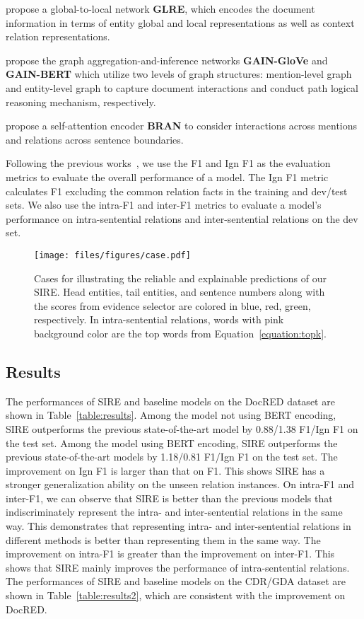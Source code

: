 \documentclass[11pt,a4paper]{article}
\begin{document}
\citet{GLRE} propose a global-to-local network \textbf{GLRE}, which encodes the document information in terms of entity global and local representations as well as context relation representations. 

\citet{GAIN} propose the graph aggregation-and-inference networks \textbf{GAIN-GloVe} and \textbf{GAIN-BERT} which utilize two levels of graph structures: mention-level graph and entity-level graph to capture document interactions and conduct path logical reasoning mechanism, respectively. 

\citet{BRAN} propose a self-attention encoder \textbf{BRAN} to consider interactions across mentions and relations across sentence boundaries.



Following the previous works~\citep{DocRED-paper,GAIN}, we use the F1 and Ign F1 as the evaluation metrics to evaluate the overall performance of a model. The Ign F1 metric calculates F1 excluding the common relation facts in the training and dev/test sets. We also use the intra-F1 and inter-F1 metrics to evaluate a model's performance on intra-sentential relations and inter-sentential relations on the dev set.

\begin{figure*}
    \centering
    \texttt{[image: files/figures/case.pdf]}
    \caption{Cases for illustrating the reliable and explainable predictions of our SIRE. Head entities, tail entities, and sentence numbers along with the scores from evidence selector are colored in blue, red, green, respectively. In intra-sentential relations, words with pink background color are the top  words from Equation~\ref{equation:topk}. }
    \label{fig:case}
\end{figure*}

\subsection{Results\label{ssec:quantitative}}
The performances of SIRE and baseline models on the DocRED dataset are shown in Table~\ref{table:results}. Among the model not using BERT encoding, SIRE outperforms the previous state-of-the-art model by 0.88/1.38 F1/Ign F1 on the test set. Among the model using BERT encoding, SIRE outperforms the previous state-of-the-art models by 1.18/0.81 F1/Ign F1 on the test set. The improvement on Ign F1 is larger than that on F1. This shows SIRE has a stronger generalization ability on the unseen relation instances. On intra-F1 and inter-F1, we can observe that SIRE is better than the previous models that indiscriminately represent the intra- and inter-sentential relations in the same way. This demonstrates that representing intra- and inter-sentential relations in different methods is better than representing them in the same way. The improvement on intra-F1 is greater than the improvement on inter-F1. This shows that SIRE mainly improves the performance of intra-sentential relations. 
The performances of SIRE and baseline models on the CDR/GDA dataset are shown in Table~\ref{table:results2}, which are consistent with the improvement on DocRED.
\end{document}
